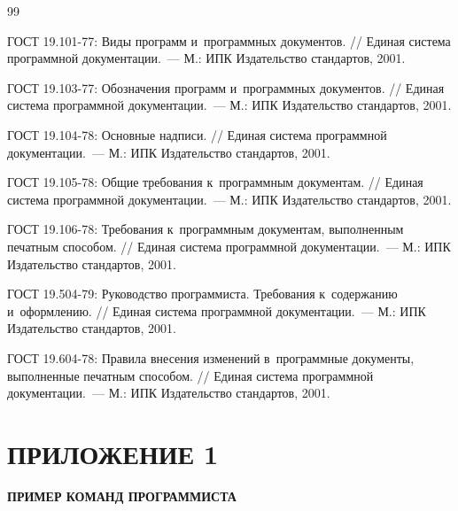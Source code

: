 \documentclass[12pt,a4paper]{extarticle}
\begin{document}
\renewcommand{\refname}{}
\begin{thebibliography}{99}
\vspace{-1cm}

ГОСТ 19.101-77: Виды программ и~программных документов. // Единая система программной документации.~--- М.: ИПК Издательство стандартов, 2001.

ГОСТ 19.103-77: Обозначения программ и~программных документов. // Единая система программной документации.~--- М.: ИПК Издательство стандартов, 2001.

ГОСТ 19.104-78: Основные надписи. // Единая система программной документации.~--- М.: ИПК Издательство стандартов, 2001.

ГОСТ 19.105-78: Общие требования к~программным документам. // Единая система программной документации.~--- М.: ИПК Издательство стандартов, 2001.

ГОСТ 19.106-78: Требования к~программным документам, выполненным печатным способом. // Единая система программной документации.~--- М.: ИПК Издательство стандартов, 2001.

ГОСТ 19.504-79: Руководство программиста. Требования к~содержанию и~оформлению. // Единая система программной документации.~--- М.: ИПК Издательство стандартов, 2001.

ГОСТ 19.604-78: Правила внесения изменений в~программные документы, выполненные печатным способом. // Единая система программной документации.~--- М.: ИПК Издательство стандартов, 2001.

\end{thebibliography}

\clearpage

\section*{ПРИЛОЖЕНИЕ 1}

\begin{center}
\textbf{ПРИМЕР КОМАНД ПРОГРАММИСТА}
\end{center}
\end{document}
